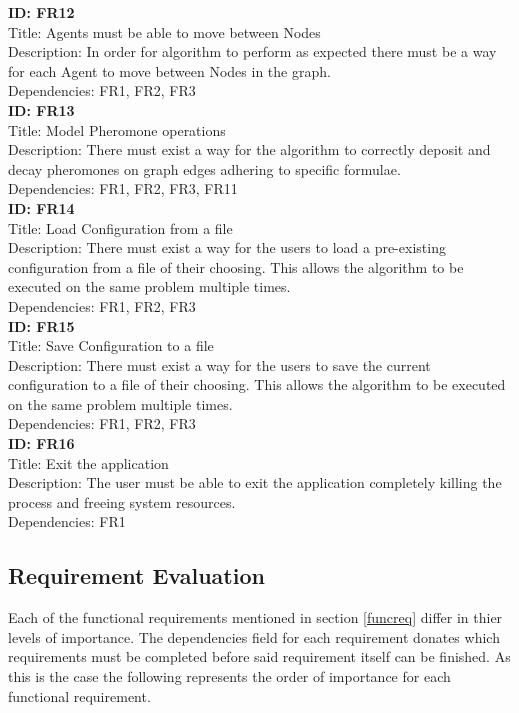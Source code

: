 \noindent
\textbf{ID: FR12}\\
Title: Agents must be able to move between Nodes\\
Description: In order for algorithm to perform as expected there must be a way for each Agent to move between Nodes in the graph. \\
Dependencies: FR1, FR2, FR3
\\

\noindent
\textbf{ID: FR13}\\
Title: Model Pheromone operations\\
Description: There must exist a way for the algorithm to correctly deposit and decay pheromones on graph edges adhering to specific formulae. \\
Dependencies: FR1, FR2, FR3, FR11
\\

\noindent
\textbf{ID: FR14}\\
Title: Load Configuration from a file\\
Description: There must exist a way for the users to load a pre-existing configuration from a file of their choosing. This allows the algorithm to be executed on the same problem multiple times. \\
Dependencies: FR1, FR2, FR3
\\

\noindent
\textbf{ID: FR15}\\
Title: Save Configuration to a file\\
Description: There must exist a way for the users to save the current configuration to a file of their choosing. This allows the algorithm to be executed on the same problem multiple times. \\
Dependencies: FR1, FR2, FR3
\\

\noindent
\textbf{ID: FR16}\\
Title: Exit the application\\
Description: The user must be able to exit the application completely killing the process and freeing system resources. \\
Dependencies: FR1
\clearpage
\subsection{Requirement Evaluation}

Each of the functional requirements mentioned in section \ref{funcreq} differ in thier levels of importance. The dependencies field for each requirement donates which requirements must be completed before said requirement itself can be finished. As this is the case the following represents the order of importance for each functional requirement.

